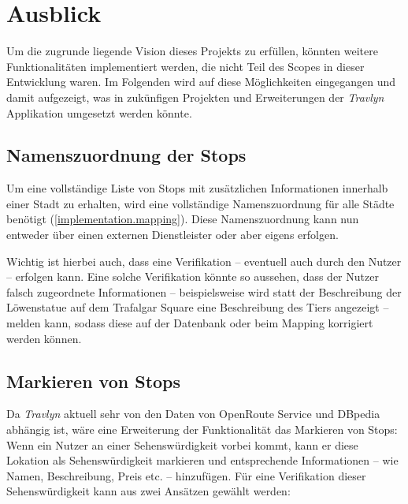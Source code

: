 \chapter{Ausblick}

	Um die zugrunde liegende Vision dieses Projekts zu erfüllen, könnten weitere Funktionalitäten implementiert werden, die nicht Teil des Scopes in dieser Entwicklung waren. Im Folgenden wird auf diese Möglichkeiten eingegangen und damit aufgezeigt, was in zukünfigen Projekten und Erweiterungen der \textit{Travlyn} Applikation umgesetzt werden könnte.
	
	\section{Namenszuordnung der Stops}
	
		Um eine vollständige Liste von Stops mit zusätzlichen Informationen innerhalb einer Stadt zu erhalten, wird eine vollständige Namenszuordnung für alle Städte benötigt (\autoref{implementation.mapping}). Diese Namenszuordnung kann nun entweder über einen externen Dienstleister oder aber eigens erfolgen. 
		
		Wichtig ist hierbei auch, dass eine Verifikation -- eventuell auch durch den Nutzer -- erfolgen kann. Eine solche Verifikation könnte so aussehen, dass der Nutzer falsch zugeordnete Informationen -- beispielsweise wird statt der Beschreibung der Löwenstatue auf dem Trafalgar Square eine Beschreibung des Tiers angezeigt -- melden kann, sodass diese auf der Datenbank oder beim Mapping korrigiert werden können. 
		
	\section{Markieren von Stops}
	
		Da \textit{Travlyn} aktuell sehr von den Daten von OpenRoute Service und DBpedia abhängig ist, wäre eine Erweiterung der Funktionalität das Markieren von Stops: Wenn ein Nutzer an einer Sehenswürdigkeit vorbei kommt, kann er diese Lokation als Sehenswürdigkeit markieren und entsprechende Informationen -- wie Namen, Beschreibung, Preis etc. -- hinzufügen. Für eine Verifikation dieser Sehenswürdigkeit kann aus zwei Ansätzen gewählt werden: 
		
